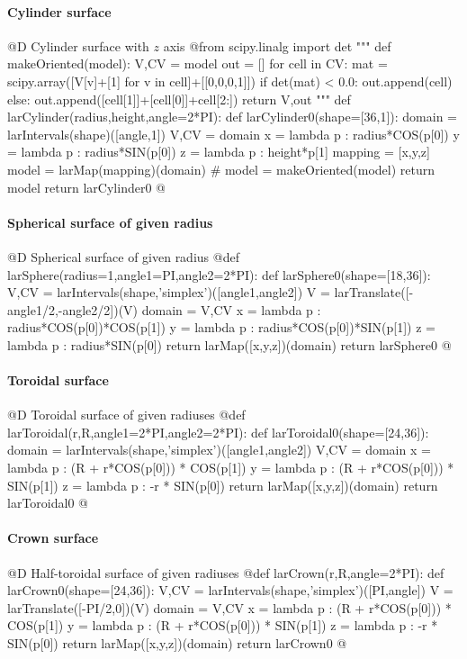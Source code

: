 \documentclass[11pt,oneside]{article}	%
\begin{document}
\paragraph{Cylinder surface}
@D Cylinder surface with $z$ axis
@{from scipy.linalg import det
"""
def makeOriented(model):
	V,CV = model
	out = []
	for cell in CV: 
		mat = scipy.array([V[v]+[1] for v in cell]+[[0,0,0,1]])
		if det(mat) < 0.0:
			out.append(cell)
		else:
			out.append([cell[1]]+[cell[0]]+cell[2:])
	return V,out
"""
def larCylinder(radius,height,angle=2*PI):
	def larCylinder0(shape=[36,1]):
		domain = larIntervals(shape)([angle,1])
		V,CV = domain
		x = lambda p : radius*COS(p[0])
		y = lambda p : radius*SIN(p[0])
		z = lambda p : height*p[1]
		mapping = [x,y,z]
		model = larMap(mapping)(domain)
		# model = makeOriented(model)
		return model
	return larCylinder0
@}
\paragraph{Spherical surface of given radius}
@D Spherical surface of given radius
@{def larSphere(radius=1,angle1=PI,angle2=2*PI):
	def larSphere0(shape=[18,36]):
		V,CV = larIntervals(shape,'simplex')([angle1,angle2])
		V = larTranslate([-angle1/2,-angle2/2])(V)
		domain = V,CV
		x = lambda p : radius*COS(p[0])*COS(p[1])
		y = lambda p : radius*COS(p[0])*SIN(p[1])
		z = lambda p : radius*SIN(p[0])
		return larMap([x,y,z])(domain)
	return larSphere0
@}
\paragraph{Toroidal surface}
@D Toroidal surface of given radiuses
@{def larToroidal(r,R,angle1=2*PI,angle2=2*PI):
	def larToroidal0(shape=[24,36]):
		domain = larIntervals(shape,'simplex')([angle1,angle2])
		V,CV = domain
		x = lambda p : (R + r*COS(p[0])) * COS(p[1])
		y = lambda p : (R + r*COS(p[0])) * SIN(p[1])
		z = lambda p : -r * SIN(p[0])
		return larMap([x,y,z])(domain)
	return larToroidal0
@}
\paragraph{Crown surface}
@D Half-toroidal surface of given radiuses
@{def larCrown(r,R,angle=2*PI):
	def larCrown0(shape=[24,36]):
		V,CV = larIntervals(shape,'simplex')([PI,angle])
		V = larTranslate([-PI/2,0])(V)
		domain = V,CV
		x = lambda p : (R + r*COS(p[0])) * COS(p[1])
		y = lambda p : (R + r*COS(p[0])) * SIN(p[1])
		z = lambda p : -r * SIN(p[0])
		return larMap([x,y,z])(domain)
	return larCrown0
@}
\end{document}
